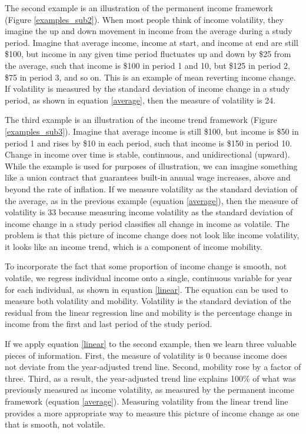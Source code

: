 \documentclass[12pt]{article}
\begin{document}
The second example is an illustration of the permanent income framework (Figure \ref{examples_sub2}). When most people think of income volatility, they imagine the up and down movement in income from the average during a study period. Imagine that average income, income at start, and income at end are still \$100, but income in any given time period fluctuates up and down by \$25 from the average, such that income is \$100 in period 1 and 10, but \$125 in period 2, \$75 in period 3, and so on. This is an example of mean reverting income change. If volatility is measured by the standard deviation of income change in a study period, as shown in equation \ref{average}, then the measure of volatility is 24.

The third example is an illustration of the income trend framework (Figure \ref{examples_sub3}). Imagine that average income is still \$100, but income is \$50 in period 1 and rises by \$10 in each period, such that income is \$150 in period 10. Change in income over time is stable, continuous, and unidirectional (upward). While the example is used for purposes of illustration, we can imagine something like a union contract that guarantees built-in annual wage increases, above and beyond the rate of inflation. If we measure volatility as the standard deviation of the average, as in the previous example (equation \ref{average}), then the measure of volatility is 33 because measuring income volatility as the standard deviation of income change in a study period classifies all change in income as volatile. The problem is that this picture of income change does not look like income volatility, it looks like an income trend, which is a component of income mobility.

To incorporate the fact that some proportion of income change is smooth, not volatile, we regress individual income onto a single, continuous variable for year for each individual, as shown in equation \ref{linear}. The equation can be used to measure both volatility and mobility. Volatility is the standard deviation of the residual from the linear regression line and mobility is the percentage change in income from the first and last period of the study period.

If we apply equation \ref{linear} to the second example, then we learn three valuable pieces of information. First, the measure of volatility is 0 because income does not deviate from the year-adjusted trend line. Second, mobility rose by a factor of three. Third, as a result, the year-adjusted trend line explains 100\% of what was previously measured as income volatility, as measured by the permanent income framework (equation \ref{average}). Measuring volatility from the linear trend line provides a more appropriate way to measure this picture of income change as one that is smooth, not volatile.
\end{document}
